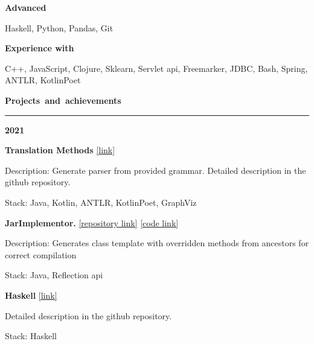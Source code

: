 \documentclass[11pt,a4paper]{report}
\begin{document}
\textbf{Advanced}

\vspace{5px}
\hspace{10px}
Haskell, Python, Pandas, Git
\vspace{5px}

\textbf{Experience with}

\vspace{5px}
\hspace{10px}
C++, JavaScript, Clojure, Sklearn, Servlet api, Freemarker, JDBC, Bash, Spring, ANTLR, KotlinPoet
\vspace{10px}


\par\hbox{\Large\textbf{Projects and achievements}}\kern5pt\hrule

\vspace{10px}
\textbf{\Large{2021}}

\hspace{10px} \textbf{Translation Methods} \href{https://github.com/Kvel4/Translation-Methods}{[link]}

\hspace{20px} Description: Generate parser from provided grammar. Detailed description in the github repository.

\hspace{20px} Stack: Java, Kotlin, ANTLR, KotlinPoet, GraphViz

\vspace{10px}


\hspace{10px} \textbf{JarImplementor.} \href{https://github.com/Kvel4/java-advanced}{[repository link]} \href{https://github.com/Kvel4/java-advanced/tree/master/java-solutions/info/kgeorgiy/ja/monakhov/implementor}{[code link]}

\hspace{20px} Description: Generates class template with overridden methods from ancestors for correct compilation

\hspace{20px} Stack: Java, Reflection api

\vspace{10px}

\hspace{10px} \textbf{Haskell} \href{https://github.com/Kvel4/haskell}{[link]}

\hspace{20px} Detailed description in the github repository.

\hspace{20px} Stack: Haskell
\end{document}
